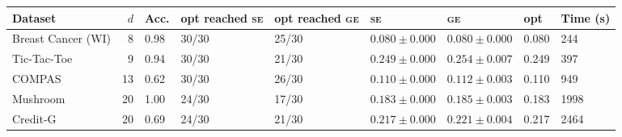 \begin{tabular}{lrlllllll}
\toprule
Dataset & $d$ & Acc. & opt reached \textsc{se} & opt reached \textsc{ge} & \textsc{se} & \textsc{ge} & opt & Time (s) \\
\midrule
Breast Cancer (WI) & 8 & 0.98 & 30/30 & 25/30 & $0.080 \pm 0.000$ & $0.080 \pm 0.000$ & 0.080 & 244 \\
Tic-Tac-Toe & 9 & 0.94 & 30/30 & 21/30 & $0.249 \pm 0.000$ & $0.254 \pm 0.007$ & 0.249 & 397 \\
COMPAS & 13 & 0.62 & 30/30 & 26/30 & $0.110 \pm 0.000$ & $0.112 \pm 0.003$ & 0.110 & 949 \\
Mushroom & 20 & 1.00 & 24/30 & 17/30 & $0.183 \pm 0.000$ & $0.185 \pm 0.003$ & 0.183 & 1998 \\
Credit-G & 20 & 0.69 & 24/30 & 21/30 & $0.217 \pm 0.000$ & $0.221 \pm 0.004$ & 0.217 & 2464 \\
\bottomrule
\end{tabular}
